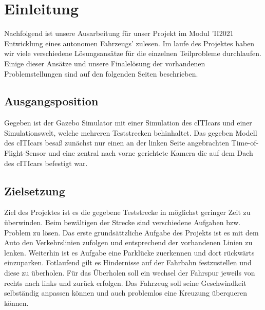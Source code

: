 \section{Einleitung}

Nachfolgend ist unsere Ausarbeitung für unser Projekt im Modul  'II2021 Entwicklung eines autonomen Fahrzeugs' zulesen. Im laufe des Projektes haben wir viele verschiedene Lösungsansätze für die einzelnen Teilprobleme durchlaufen. Einige dieser Ansätze und unsere Finalelösung der vorhandenen Problemstellungen sind auf den folgenden Seiten beschrieben.

\subsection{Ausgangsposition}
    
Gegeben ist der Gazebo Simulator mit einer Simulation des cITIcars und einer Simulationswelt, welche mehreren Teststrecken behinhaltet. Das gegeben Modell des cITIcars besaß zunächst nur einen an der linken Seite angebrachten Time-of-Flight-Sensor und eine zentral nach vorne gerichtete Kamera die auf dem Dach des cITIcars befestigt war.

\subsection{Zielsetzung}

Ziel des Projektes ist es die gegebene Teststrecke in möglichst geringer Zeit zu überwinden. Beim bewältigen der Strecke sind verschiedene Aufgaben bzw. Problem zu lösen. Das erste grundsättzliche Aufgabe des Projekts ist es mit dem Auto den Verkehrslinien zufolgen und entsprechend der vorhandenen Linien   zu lenken. Weiterhin ist es Aufgabe eine Parklücke zuerkennen und dort rückwärts einzuparken. Fotlaufend gilt es Hindernisse auf der Fahrbahn festzustellen und diese zu überholen. Für das Überholen soll ein wechsel der Fahrspur jeweils von rechts nach links und zurück erfolgen. Das Fahrzeug soll seine Geschwindkeit selbständig anpassen können und auch problemlos eine Kreuzung überqueren können. 
